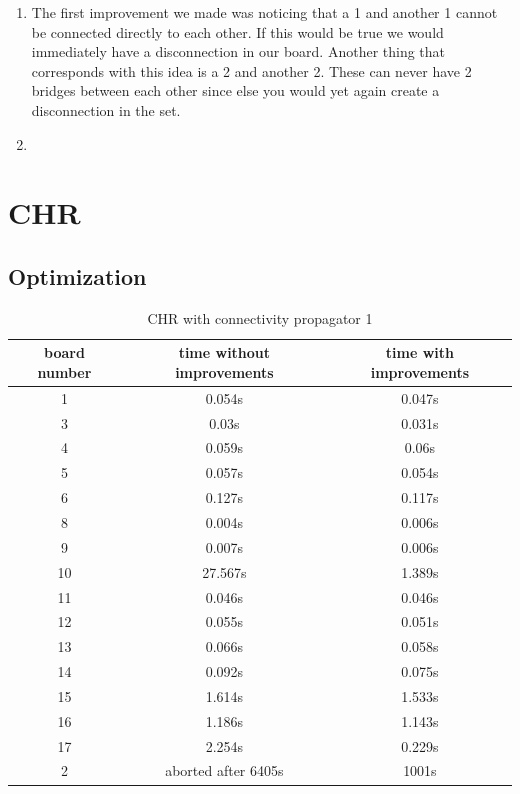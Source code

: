 \documentclass{report}
\begin{document}
\begin{enumerate}
	\item The first improvement we made was noticing that a 1 and another 1 cannot be connected  directly to each other. If this would be true we would immediately have a disconnection in our board. Another thing that corresponds with this idea is a 2 and another 2. These can never have 2 bridges between each other since else you would yet again create a disconnection in the set.
	\item 
\end{enumerate}

\section{CHR}
\subsection{Optimization}
\begin{table}[h]
\centering
\begin{tabular}{|c|c|c|}
\hline
 board number & time without improvements &  time with improvements  \\ \hline
       1   & 0.054s & 0.047s \\
       3   & 0.03s & 0.031s \\
       4   & 0.059s & 0.06s \\
       5   & 0.057s & 0.054s \\
       6   & 0.127s & 0.117s \\
       8   & 0.004s & 0.006s \\
       9   & 0.007s & 0.006s \\
       10  & 27.567s & 1.389s \\
       11  & 0.046s & 0.046s \\
       12  & 0.055s & 0.051s \\
       13  & 0.066s & 0.058s \\
       14  & 0.092s & 0.075s \\
       15  & 1.614s & 1.533s \\
       16  & 1.186s & 1.143s \\
       17  & 2.254s & 0.229s \\
       2   & aborted after 6405s & 1001s \\
\hline
\end{tabular}
\caption{CHR with connectivity propagator 1}
\end{table}
\end{document}
